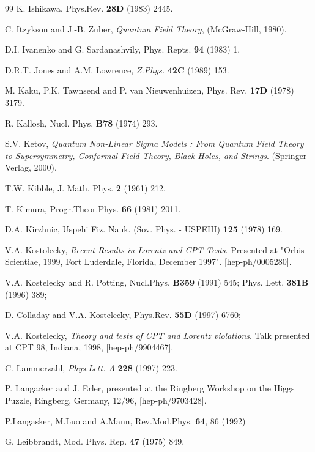 \begin{thebibliography}{99}
 K. Ishikawa, Phys.Rev. {\bf 28D} (1983) 2445. 

C. Itzykson and J.-B. Zuber, {\sl Quantum Field Theory},
(McGraw-Hill, 1980).

D.I. Ivanenko and G. Sardanashvily, Phys. Repts.
{\bf 94} (1983) 1.

D.R.T. Jones and A.M. Lowrence, {\sl Z.Phys.} {\bf 42C} (1989) 153.

 M. Kaku, P.K. Tawnsend and P. van Nieuwenhuizen,
Phys. Rev. {\bf 17D} (1978) 3179.

R. Kallosh, Nucl. Phys. {\bf B78} (1974) 293.
 
 S.V. Ketov, 
{\sl Quantum Non-Linear Sigma Models : From Quantum Field Theory to 
Supersymmetry, Conformal Field Theory, Black Holes, and Strings}.
(Springer Verlag, 2000).
 
T.W. Kibble, J. Math. Phys. {\bf 2} (1961) 212.

T. Kimura, Progr.Theor.Phys. {\bf 66} (1981) 2011.

D.A. Kirzhnic, Uspehi Fiz. Nauk. 
(Sov. Phys. - USPEHI) {\bf 125} (1978) 169.

 V.A. Kostolecky, {\sl Recent Results in Lorentz
and CPT Tests}. Presented at "Orbis Scientiae, 1999, Fort Luderdale,
Florida, December 1997". [hep-ph/0005280].

V.A. Kostelecky and R. Potting, Nucl.Phys. {\bf B359}
(1991) 545; Phys. Lett. {\bf 381B} (1996) 389;

D. Colladay and V.A. Kostelecky, Phys.Rev. {\bf 55D} (1997) 6760;

V.A. Kostelecky, {\sl Theory and tests of CPT and Lorentz violations}.
Talk presented at CPT 98, Indiana, 1998, [hep-ph/9904467].

C. Lammerzahl, {\sl Phys.Lett. A} {\bf 228} (1997) 223.

P. Langacker and J. Erler, presented at the Ringberg Workshop on the
Higgs Puzzle, Ringberg, Germany, 12/96, [hep-ph/9703428].

P.Langasker, M.Luo and A.Mann, Rev.Mod.Phys. {\bf 64}, 86 (1992)

 G. Leibbrandt, 
Mod. Phys. Rep. {\bf 47} (1975) 849. %


\end{thebibliography}
